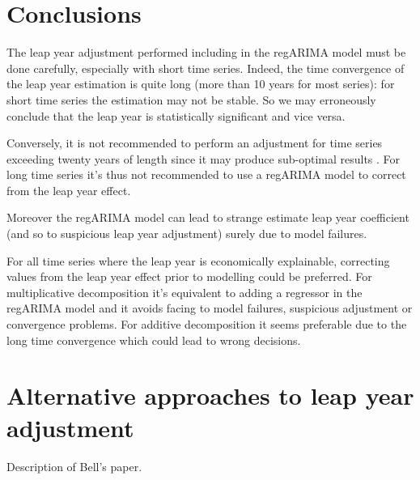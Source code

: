 \documentclass[]{article}
\theoremstyle{definition}
\theoremstyle{definition}
\theoremstyle{definition}
\theoremstyle{remark}
\begin{document}
\section{Conclusions}\label{conclusions}

The leap year adjustment performed including in the regARIMA model must
be done carefully, especially with short time series. Indeed, the time
convergence of the leap year estimation is quite long (more than 10
years for most series): for short time series the estimation may not be
stable. So we may erroneously conclude that the leap year is
statistically significant and vice versa.

Conversely, it is not recommended to perform an adjustment for time
series exceeding twenty years of length since it may produce sub-optimal
results \citep{eurostat2015guidelines}. For long time series it's thus
not recommended to use a regARIMA model to correct from the leap year
effect.

Moreover the regARIMA model can lead to strange estimate leap year
coefficient (and so to suspicious leap year adjustment) surely due to
model failures.

For all time series where the leap year is economically explainable,
correcting values from the leap year effect prior to modelling could be
preferred. For multiplicative decomposition it's equivalent to adding a
regressor in the regARIMA model and it avoids facing to model failures,
suspicious adjustment or convergence problems. For additive
decomposition it seems preferable due to the long time convergence which
could lead to wrong decisions.

\appendix

\section{Alternative approaches to leap year
adjustment}\label{sect:appendix}

Description of Bell's paper.


\end{document}
